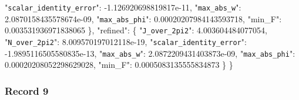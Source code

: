 \documentclass[
  10pt,
]{article}
\newenvironment{Shaded}{}{}
\newcommand{\DataTypeTok}[1]{\textcolor[rgb]{0.56,0.13,0.00}{#1}}
\newcommand{\FloatTok}[1]{\textcolor[rgb]{0.25,0.63,0.44}{#1}}
\newcommand{\FunctionTok}[1]{\textcolor[rgb]{0.02,0.16,0.49}{#1}}
\begin{document}
\begin{Shaded}
\begin{Highlighting}[]
    \DataTypeTok{"\nolinkurl{scalar_identity_error}"}\FunctionTok{:} \FloatTok{{-}1.126920698819817e{-}11}\FunctionTok{,}
    \DataTypeTok{"\nolinkurl{max_abs_w}"}\FunctionTok{:} \FloatTok{2.0870158435578674e{-}09}\FunctionTok{,}
    \DataTypeTok{"\nolinkurl{max_abs_phi}"}\FunctionTok{:} \FloatTok{0.00020207984143593718}\FunctionTok{,}
    \DataTypeTok{"min\_F"}\FunctionTok{:} \FloatTok{0.003531936971838065}
  \FunctionTok{\},}
  \DataTypeTok{"refined"}\FunctionTok{:} \FunctionTok{\{}
    \DataTypeTok{"\nolinkurl{J_over_2pi2}"}\FunctionTok{:} \FloatTok{4.003604484077054}\FunctionTok{,}
    \DataTypeTok{"\nolinkurl{N_over_2pi2}"}\FunctionTok{:} \FloatTok{8.009570197012118e{-}19}\FunctionTok{,}
    \DataTypeTok{"\nolinkurl{scalar_identity_error}"}\FunctionTok{:} \FloatTok{{-}1.9895116505580835e{-}13}\FunctionTok{,}
    \DataTypeTok{"\nolinkurl{max_abs_w}"}\FunctionTok{:} \FloatTok{2.0872209431403873e{-}09}\FunctionTok{,}
    \DataTypeTok{"\nolinkurl{max_abs_phi}"}\FunctionTok{:} \FloatTok{0.00020208052298629028}\FunctionTok{,}
    \DataTypeTok{"min\_F"}\FunctionTok{:} \FloatTok{0.0005083135555834873}
  \FunctionTok{\}}
\FunctionTok{\}}
\end{Highlighting}
\end{Shaded}

\hypertarget{record-9-1}{%
\subsubsection{Record 9}\label{record-9-1}}
\end{document}
